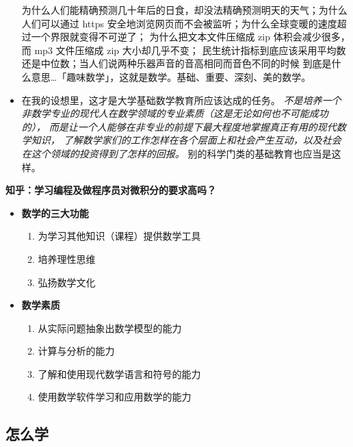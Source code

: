 \begin{shaded}
\begin{itemize}
	  为什么人们能精确预测几十年后的日食，却没法精确预测明天的天气；为什么人们可以通过 https 
	  安全地浏览网页而不会被监听；为什么全球变暖的速度超过一个界限就变得不可逆了；
	  为什么把文本文件压缩成 zip 体积会减少很多，而 mp3 文件压缩成 zip 大小却几乎不变；
	  民生统计指标到底应该采用平均数还是中位数；当人们说两种乐器声音的音高相同而音色不同的时候
	  到底是什么意思\ldots{}「趣味数学」，这就是数学。基础、重要、深刻、美的数学。
	  \item 在我的设想里，这才是大学基础数学教育所应该达成的任务。
	  {\it 不是培养一个非数学专业的现代人在数学领域的专业素质（这是无论如何也不可能成功的），
	  而是让一个人能够在非专业的前提下最大程度地掌握真正有用的现代数学知识，
	  了解数学家们的工作怎样在各个层面上和社会产生互动，以及社会在这个领域的投资得到了怎样的回报。}
	  别的科学门类的基础教育也应当是这样。
	\end{itemize}
	{\bf 知乎：学习编程及做程序员对微积分的要求高吗？}
\end{shaded}

\begin{itemize}
  \item {\bf 数学的三大功能}
  \begin{enumerate}
    \item 为学习其他知识（课程）提供数学工具
    \item 培养理性思维
    \item 弘扬数学文化
  \end{enumerate}
  \item {\bf 数学素质}
  \begin{enumerate}
    \item 从实际问题抽象出数学模型的能力
    \item 计算与分析的能力
    \item 了解和使用现代数学语言和符号的能力
    \item 使用数学软件学习和应用数学的能力
  \end{enumerate}
\end{itemize}

\subsection{怎么学}

